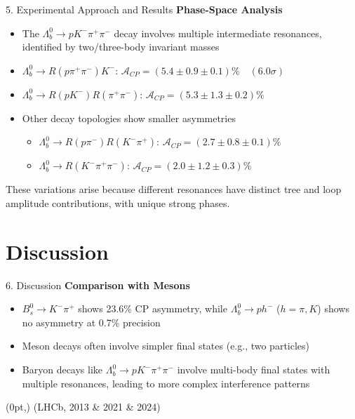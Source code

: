 \documentclass[xcolor=dvipsnames]{beamer}
\def\s{\sigma}
\def\Ld{\Lambda}
\newcommand{\br}[1]{
  \begin{textblock*}{\textwidth}(0pt,\textheight-15pt)
    \raggedleft
    \small{(#1)}
  \end{textblock*}
}
\begin{document}
\begin{frame}{5. Experimental Approach and Results}
\textbf{Phase-Space Analysis}\\
\begin{itemize}
    \item The $\Ld_{b}^{0}\to pK^{-}\pi^{+}\pi^{-}$ decay involves multiple intermediate resonances, identified by two/three-body invariant masses
    \item $\Ld_{b}^{0}\to R(p\pi^{+}\pi^{-})K^{-}$: $\mathcal{A}_{CP}=(5.4\pm 0.9\pm 0.1)\% \quad (6.0\s)$
    \item $\Ld_{b}^{0}\to R(pK^{-})R(\pi^{+}\pi^{-})$: $\mathcal{A}_{CP}=(5.3\pm 1.3\pm 0.2)\%$
    \item Other decay topologies show smaller asymmetries\\
    \begin{itemize}
        \item $\Ld_{b}^{0}\to R(p\pi^{-})R(K^{-}\pi^{+})$: $\mathcal{A}_{CP}=(2.7\pm0.8\pm0.1)\%$
        \item $\Ld_{b}^{0}\to R(K^{-}\pi^{+}\pi^{-})$: $\mathcal{A}_{CP}=(2.0\pm1.2\pm0.3)\%$
    \end{itemize}
\end{itemize}
\vspace{10pt}
These variations arise because different resonances have distinct tree and loop amplitude contributions, with unique strong phases.
\end{frame}

\section{Discussion}
\begin{frame}{6. Discussion}
\textbf{Comparison with Mesons}\\
\begin{itemize}
    \item $B_{s}^{0}\to K^{-}\pi^{+}$ shows 23.6\% CP asymmetry, while $\Ld_{b}^{0}\to ph^{-}$ ($h=\pi, K$) shows no asymmetry at 0.7\% precision
    \item Meson decays often involve simpler final states (e.g., two particles)
    \item Baryon decays like $\Ld_{b}^{0}\to pK^{-}\pi^{+}\pi^{-}$ involve multi-body final states with multiple resonances, leading to more complex interference patterns
\end{itemize}
\br{LHCb, 2013 \& 2021 \& 2024}
\end{frame}
\end{document}
